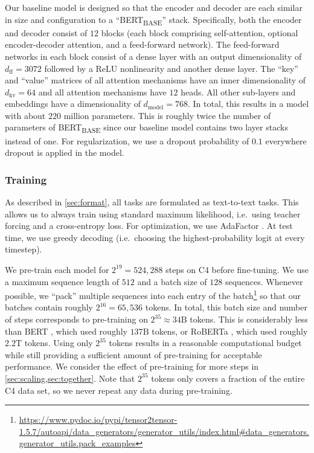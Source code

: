 Our baseline model is designed so that the encoder and decoder are each similar in size and configuration to a ``BERT\textsubscript{BASE}'' \citep{devlin2018bert} stack. Specifically, both the encoder and decoder consist of $12$ blocks (each block comprising self-attention, optional encoder-decoder attention, and a feed-forward network). The feed-forward networks in each block consist of a dense layer with an output dimensionality of $d_{\mathrm{ff}} = 3072$ followed by a ReLU nonlinearity and another dense layer. The ``key'' and ``value'' matrices of all attention mechanisms have an inner dimensionality of $d_{\mathrm{kv}} = 64$ and all attention mechanisms have $12$ heads. All other sub-layers and embeddings have a dimensionality of $d_{\mathrm{model}} = 768$. In total, this results in a model with about $220$ million parameters. This is roughly twice the number of parameters of BERT\textsubscript{BASE} since our baseline model contains two layer stacks instead of one. For regularization, we use a dropout probability of $0.1$ everywhere dropout is applied in the model.

\subsubsection{Training}
\label{sec:training}

As described in \ref{sec:format}, all tasks are formulated as text-to-text tasks. This allows us to always train using standard maximum likelihood, i.e.\ using teacher forcing \citep{williams1989learning} and a cross-entropy loss. For optimization, we use AdaFactor \citep{shazeer2018adafactor}. At test time, we use greedy decoding (i.e.\ choosing the highest-probability logit at every timestep).

We pre-train each model for $2^{19} = 524{,}288$ steps on C4 before fine-tuning. We use a maximum sequence length of $512$ and a batch size of $128$ sequences. Whenever possible, we ``pack'' multiple sequences into each entry of the batch\footnote{\url{https://www.pydoc.io/pypi/tensor2tensor-1.5.7/autoapi/data_generators/generator_utils/index.html\#data_generators.generator_utils.pack_examples}} so that our batches contain roughly $2^{16} = 65{,}536$ tokens. In total, this batch size and number of steps corresponds to pre-training on $2^{35} \approx 34\mathrm{B}$ tokens. This is considerably less than BERT \citep{devlin2018bert}, which used roughly $137\mathrm{B}$ tokens, or RoBERTa \citep{liu2019roberta}, which used roughly $2.2\mathrm{T}$ tokens. Using only $2^{35}$ tokens results in a reasonable computational budget while still providing a sufficient amount of pre-training for acceptable performance. We consider the effect of pre-training for more steps in \ref{sec:scaling,sec:together}.
Note that $2^{35}$ tokens only covers a fraction of the entire C4 data set, so we never repeat any data during pre-training.

